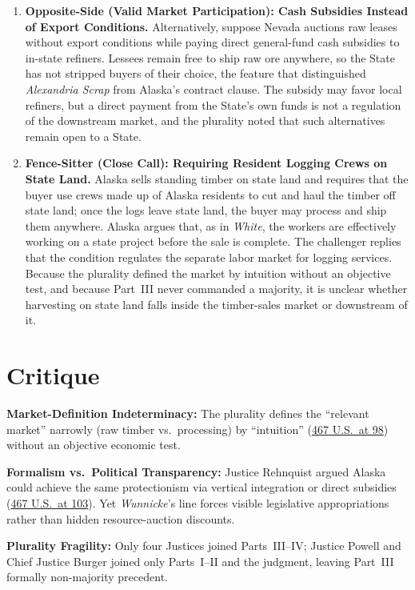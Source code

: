 \documentclass[12pt]{article}
\begin{document}
\begin{enumerate}
\item \textbf{Opposite-Side (Valid Market Participation): Cash Subsidies Instead of Export Conditions.} Alternatively, suppose Nevada auctions raw leases without export conditions while paying direct general-fund cash subsidies to in-state refiners. Lessees remain free to ship raw ore anywhere, so the State has not stripped buyers of their choice, the feature that distinguished \textit{Alexandria Scrap} from Alaska's contract clause. The subsidy may favor local refiners, but a direct payment from the State's own funds is not a regulation of the downstream market, and the plurality noted that such alternatives remain open to a State.

\item \textbf{Fence-Sitter (Close Call): Requiring Resident Logging Crews on State Land.} Alaska sells standing timber on state land and requires that the buyer use crews made up of Alaska residents to cut and haul the timber off state land; once the logs leave state land, the buyer may process and ship them anywhere. Alaska argues that, as in \textit{White}, the workers are effectively working on a state project before the sale is complete. The challenger replies that the condition regulates the separate labor market for logging services. Because the plurality defined the market by intuition without an objective test, and because Part~III never commanded a majority, it is unclear whether harvesting on state land falls inside the timber-sales market or downstream of it.

\end{enumerate}

\section{Critique}
\textbf{Market-Definition Indeterminacy:} The plurality defines the ``relevant market'' narrowly (raw timber vs.\ processing) by ``intuition'' (\href{https://supreme.justia.com/cases/federal/us/467/82/}{467 U.S.\ at 98}) without an objective economic test.

\textbf{Formalism vs.\ Political Transparency:} Justice Rehnquist argued Alaska could achieve the same protectionism via vertical integration or direct subsidies (\href{https://supreme.justia.com/cases/federal/us/467/82/}{467 U.S.\ at 103}). Yet \textit{Wunnicke}'s line forces visible legislative appropriations rather than hidden resource-auction discounts.

\textbf{Plurality Fragility:} Only four Justices joined Parts~III--IV; Justice Powell and Chief Justice Burger joined only Parts~I--II and the judgment, leaving Part~III formally non-majority precedent.
\end{document}
